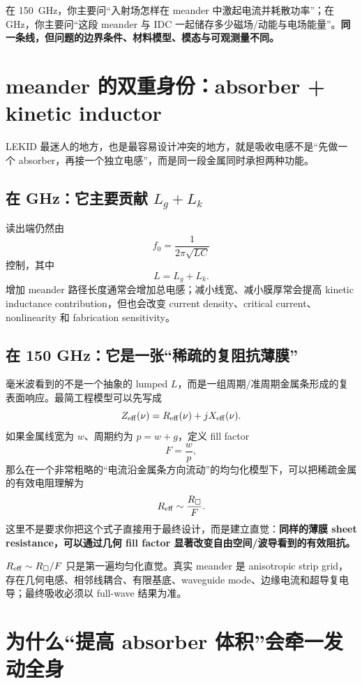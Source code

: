 \documentclass[11pt,a4paper,openany]{ctexrep}
\begin{document}
\begin{intuitionbox}
在 \SI{150}{GHz}，你主要问“入射场怎样在 meander 中激起电流并耗散功率”；在 GHz，你主要问“这段 meander 与 IDC 一起储存多少磁场/动能与电场能量”。\textbf{同一条线，但问题的边界条件、材料模型、模态与可观测量不同。}
\end{intuitionbox}

\section{meander 的双重身份：absorber + kinetic inductor}

LEKID 最迷人的地方，也是最容易设计冲突的地方，就是吸收电感不是“先做一个 absorber，再接一个独立电感”，而是同一段金属同时承担两种功能。

\subsection{在 GHz：它主要贡献 $L_g+L_k$}

读出端仍然由
\[
f_0=\frac{1}{2\pi\sqrt{LC}}
\]
控制，其中
\[
L=L_g+L_k.
\]
增加 meander 路径长度通常会增加总电感；减小线宽、减小膜厚常会提高 kinetic inductance contribution，但也会改变 current density、critical current、nonlinearity 和 fabrication sensitivity。

\subsection{在 150 GHz：它是一张“稀疏的复阻抗薄膜”}

毫米波看到的不是一个抽象的 lumped $L$，而是一组周期/准周期金属条形成的复表面响应。最简工程模型可以先写成
\[
Z_{\rm eff}(\nu)=R_{\rm eff}(\nu)+jX_{\rm eff}(\nu).
\]
如果金属线宽为 $w$、周期约为 $p=w+g$，定义 fill factor
\[
F=\frac{w}{p},
\]
那么在一个非常粗略的“电流沿金属条方向流动”的均匀化模型下，可以把稀疏金属的有效电阻理解为
\[
R_{\rm eff}\sim \frac{R_{\square}}{F}.
\]
这里不是要求你把这个式子直接用于最终设计，而是建立直觉：\textbf{同样的薄膜 sheet resistance，可以通过几何 fill factor 显著改变自由空间/波导看到的有效阻抗。}

\begin{mistakebox}
$R_{\rm eff}\sim R_{\square}/F$ 只是第一遍均匀化直觉。真实 meander 是 anisotropic strip grid，存在几何电感、相邻线耦合、有限基底、waveguide mode、边缘电流和超导复电导；最终吸收必须以 full-wave 结果为准。
\end{mistakebox}

\section{为什么“提高 absorber 体积”会牵一发动全身}
\end{document}
